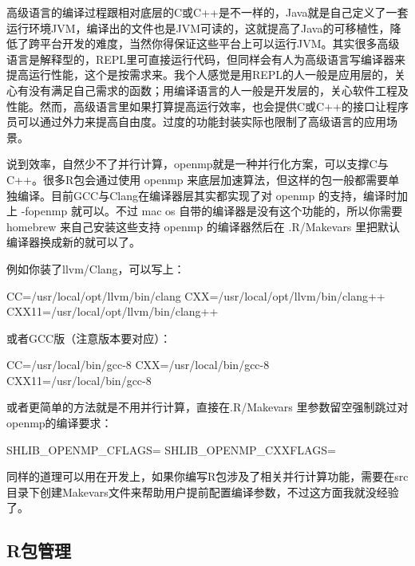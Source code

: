 \documentclass[]{tufte-book}
\begin{document}
高级语言的编译过程跟相对底层的C或C++是不一样的，Java就是自己定义了一套运行环境JVM，编译出的文件也是JVM可读的，这就提高了Java的可移植性，降低了跨平台开发的难度，当然你得保证这些平台上可以运行JVM。其实很多高级语言是解释型的，REPL里可直接运行代码，但同样会有人为高级语言写编译器来提高运行性能，这个是按需求来。我个人感觉是用REPL的人一般是应用层的，关心有没有满足自己需求的函数；用编译语言的人一般是开发层的，关心软件工程及性能。然而，高级语言里如果打算提高运行效率，也会提供C或C++的接口让程序员可以通过外力来提高自由度。过度的功能封装实际也限制了高级语言的应用场景。

说到效率，自然少不了并行计算，openmp就是一种并行化方案，可以支撑C与C++。很多R包会通过使用 openmp 来底层加速算法，但这样的包一般都需要单独编译。目前GCC与Clang在编译器层其实都实现了对 openmp 的支持，编译时加上 -fopenmp 就可以。不过 mac os 自带的编译器是没有这个功能的，所以你需要 homebrew 来自己安装这些支持 openmp 的编译器然后在 .R/Makevars 里把默认编译器换成新的就可以了。

例如你装了llvm/Clang，可以写上：

CC=/usr/local/opt/llvm/bin/clang
CXX=/usr/local/opt/llvm/bin/clang++
CXX11=/usr/local/opt/llvm/bin/clang++

或者GCC版（注意版本要对应）：

CC=/usr/local/bin/gcc-8
CXX=/usr/local/bin/gcc-8
CXX11=/usr/local/bin/gcc-8

或者更简单的方法就是不用并行计算，直接在.R/Makevars 里参数留空强制跳过对openmp的编译要求：

SHLIB\_OPENMP\_CFLAGS=
SHLIB\_OPENMP\_CXXFLAGS=

同样的道理可以用在开发上，如果你编写R包涉及了相关并行计算功能，需要在src目录下创建Makevars文件来帮助用户提前配置编译参数，不过这方面我就没经验了。

\hypertarget{rux5305ux7ba1ux7406}{%
\subsection*{R包管理}\label{rux5305ux7ba1ux7406}}
\end{document}

